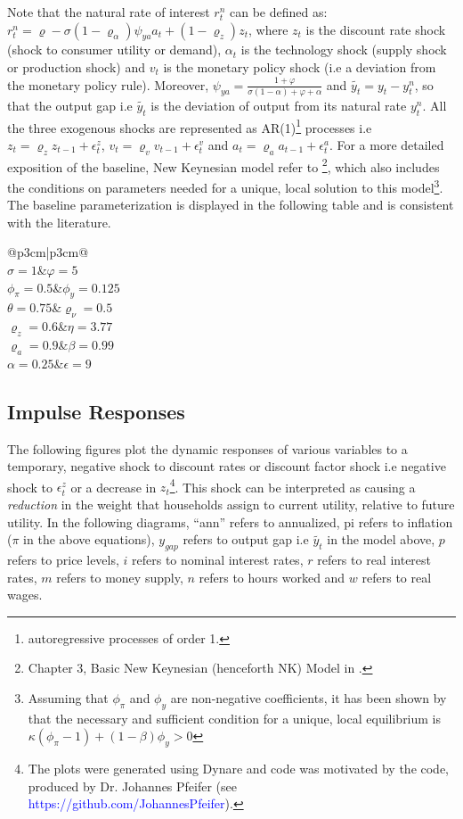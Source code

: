 \documentclass[12pt]{article}
\makeatletter
\newcommand\Taccount[3][3cm]%
{{\renewcommand\arraystretch{1.3}%
		\begin{adjustbox}{width=0.4\textwidth}
		\begin{tabular}[t]{@{}p{#1}|p{#1}@{}}
			\multicolumn{2}{@{}c@{}}{#2}\\
			\hline
			\hline
			#3
		\end{tabular}%
		\end{adjustbox}
	
}}
\newcommand{\1}{\mathbbm 1}
\renewcommand{\rho}{\varrho}
\makeatother
\begin{document}
Note that the natural rate of interest $r_{t}^{n}$ can be defined as: $r_{t}^{n} = \rho - \sigma (1 - \rho_{\alpha}) \psi_{ya} a_{t} + (1 - \rho_{z}) z_{t}$, where $z_{t}$ is the discount rate shock (shock to consumer utility or demand), $\alpha_{t}$ is the technology shock (supply shock or production shock) and $v_{t}$ is the monetary policy shock (i.e a deviation from the monetary policy rule). Moreover, $\psi_{ya} = \frac{1 + \varphi}{\sigma (1 - \alpha) + \varphi + \alpha}$ and $\widetilde{y_{t}} = y_{t} - y_{t}^{n}$, so that the output gap i.e $\widetilde{y_{t}}$ is the deviation of output from its natural rate $ y_{t}^{n}$. All the three exogenous shocks are represented as AR(1)\footnote{autoregressive processes of order 1.} processes i.e $z_{t} = \rho_{z} z_{t-1} + \epsilon_{t}^{z}$, $v_{t} = \rho_{v} v_{t-1} + \epsilon_{t}^{v}$ and $a_{t} = \rho_{a} a_{t-1} + \epsilon_{t}^{a}$. For a more detailed exposition of the baseline, New Keynesian model refer to \cite{gali2015book}\footnote{Chapter 3, Basic New Keynesian (henceforth NK) Model in \cite{gali2015book}.}, which also includes the conditions on parameters needed for a unique, local solution to this model\footnote{Assuming that $\phi_{\pi}$ and $\phi_{y}$ are non-negative coefficients, it has been shown by \cite{bullard2002learning} that the necessary and sufficient condition for a unique, local equilibrium is $\kappa (\phi_{\pi} - 1) + (1 - \beta) \phi_{y} > 0$}. The baseline parameterization is displayed in the following table and is consistent with the literature.

	\begin{center}
	\Taccount{NK Model Parameters}{$\sigma = 1$&$\varphi = 5$\\$\phi_{\pi} = 0.5$&$\phi_{y}=0.125$\\$\theta = 0.75$&$\rho_{\nu} = 0.5$\\$\rho_{z} = 0.6$&$\eta=3.77$\\$\rho_{a} = 0.9$&$\beta=0.99$\\$\alpha=0.25$&$\epsilon=9$}
\end{center}


\subsection{Impulse Responses}



The following figures plot the dynamic responses of various variables to a temporary, negative shock to discount rates or discount factor shock i.e negative shock to $\epsilon_{t}^{z}$ or a decrease in $z_{t}$\footnote{The plots were generated using Dynare and code was motivated by the code, produced by Dr. Johannes Pfeifer (see \textcolor{blue}{https://github.com/JohannesPfeifer}).}. This shock can be interpreted as causing a \textit{reduction} in the weight that households assign to current utility, relative to future utility. In the following diagrams, ``ann'' refers to annualized, pi refers to inflation ($\pi$ in the above equations), $y_{gap}$ refers to output gap i.e $\widetilde{y_{t}}$ in the model above, $p$ refers to price levels, $i$ refers to nominal interest rates, $r$ refers to real interest rates, $m$ refers to money supply, $n$ refers to hours worked and $w$ refers to real wages.
\end{document}
